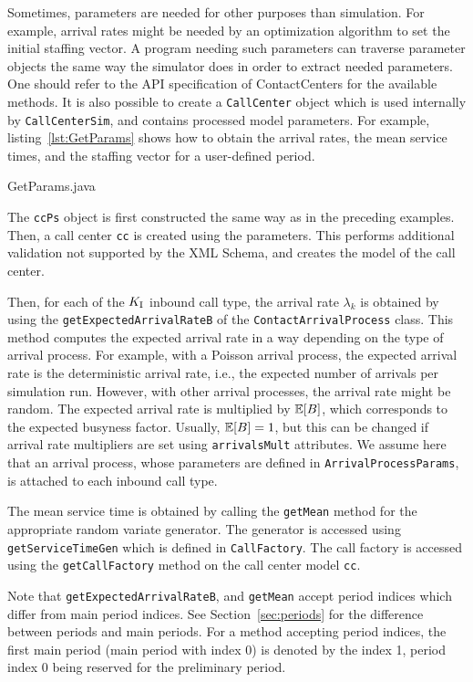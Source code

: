 Sometimes, parameters are needed for other purposes than simulation.
For example, arrival rates might be needed by an optimization algorithm
to set the initial staffing vector.
A program needing such parameters can traverse parameter objects
the same way the simulator does in order to extract needed parameters.
One should refer to the API specification of ContactCenters for the
available methods.
It is also possible to create a \texttt{Call\-Center} object which is
used internally by \texttt{Call\-Center\-Sim}, and contains processed
model parameters.
For example, listing~\ref{lst:GetParams} shows how to obtain the
arrival rates, the mean service times, and the staffing vector for a
user-defined period.


{GetParams.java}

The \texttt{ccPs} object is first constructed the same way as in the
preceding examples.
Then, a call center \texttt{cc} is created using the parameters.
This performs additional validation not supported by the XML Schema,
and creates the model of the call center.

Then, for each of the $K_{\mathrm{I}}$ inbound call type, the arrival rate
$\lambda_k$ is obtained by using the
\texttt{get\-Expected\-Arrival\-RateB} of the
\texttt{Contact\-Arrival\-Process} class.
This method computes the expected arrival rate in a way depending on the type of
arrival process.
For example, with a Poisson arrival process, the expected arrival rate is the
deterministic arrival rate,
i.e., the expected number of arrivals per simulation run.
However, with other arrival processes, the arrival rate might be
random.
The expected arrival rate is multiplied by $\mathbb{E}[B]$, which corresponds
to the expected busyness factor.
Usually, $\mathbb{E}[B]=1$, but this can be changed if arrival rate
multipliers are set using \texttt{arrivalsMult} attributes.
We assume here that
an arrival process, whose parameters are defined in
\texttt{Arrival\-Process\-Params}, is attached to each inbound call
type.

The mean service time is obtained by calling the \texttt{get\-Mean}
method for the appropriate random variate generator.
The generator is accessed using \texttt{get\-Service\-Time\-Gen} which
is defined in \texttt{Call\-Factory}.  The call factory is accessed
using the \texttt{get\-Call\-Factory} method on the call center model \texttt{cc}.

Note that \texttt{get\-Expected\-Arrival\-RateB}, and
\texttt{get\-Mean} accept period indices which differ
from main period indices.
See Section~\ref{sec:periods} for the difference between periods and
main periods.
For a method accepting period indices, the first main period (main
period with index 0) is denoted by the index 1, period index 0 being
reserved for the preliminary period.

